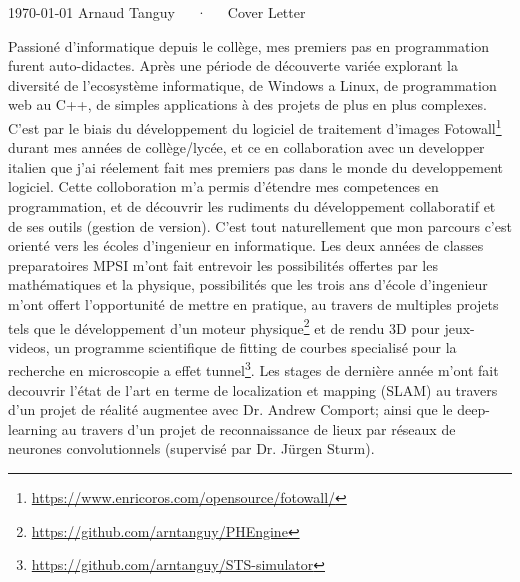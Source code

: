 \documentclass[11pt, a4paper]{awesome-cv}
\begin{document}
\makecvheader[R]

\makecvfooter
  {\today}
  {Arnaud Tanguy~~~·~~~Cover Letter}
  {}

\makelettertitle

\begin{cvletter}

  Passioné d'informatique depuis le collège, mes premiers pas en programmation furent auto-didactes. Après une période de découverte variée explorant la diversité de l'ecosystème informatique, de Windows a Linux, de programmation web au C++, de simples applications à des projets de plus en plus complexes. C'est par le biais du développement du logiciel de traitement d'images Fotowall\footnote{\url{https://www.enricoros.com/opensource/fotowall/}} durant mes années de collège/lycée, et ce en collaboration avec un developper italien que j'ai réelement fait mes premiers pas dans le monde du developpement logiciel. Cette colloboration m'a permis d'étendre mes competences en programmation, et de découvrir les rudiments du développement collaboratif et de ses outils (gestion de version). C'est tout naturellement que mon parcours c'est orienté vers les écoles d'ingenieur en informatique. Les deux années de classes preparatoires MPSI m'ont fait entrevoir les possibilités offertes par les mathématiques et la physique, possibilités que les trois ans d'école d'ingenieur m'ont offert l'opportunité de mettre en pratique, au travers de multiples projets tels que le développement d'un moteur physique\footnote{\url{https://github.com/arntanguy/PHEngine}} et de rendu 3D pour jeux-videos, un programme scientifique de fitting de courbes specialisé pour la recherche en microscopie a effet tunnel\footnote{\url{https://github.com/arntanguy/STS-simulator}}. Les stages de dernière année m'ont fait decouvrir l'état de l'art en terme de localization et mapping (SLAM) au travers d'un projet de réalité augmentee avec Dr. Andrew Comport; ainsi que le deep-learning au travers d'un projet de reconnaissance de lieux par réseaux de neurones convolutionnels (supervisé par Dr. Jürgen Sturm).


\end{cvletter}
\end{document}
